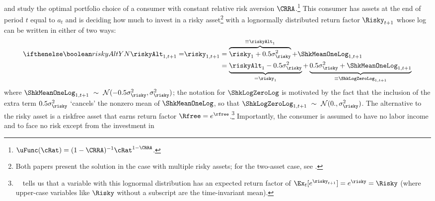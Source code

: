 
\newcommand{\scale}{x}

\cite{merton:restat} and \cite{samuelson:portfolio} study the optimal portfolio choice of a consumer with constant relative risk aversion $\CRRA$.\footnote{$\uFunc(\cRat) = (1-\CRRA)^{-1}\cRat^{1-\CRRA}$.}  This consumer has assets at the end of period $t$ equal to $a_{t}$ and is deciding how much to invest in a risky asset\footnote{Both papers present the solution in the case with multiple risky assets; for the two-asset case, see .} with a lognormally distributed return factor $\Risky_{t+1}$ whose log can be written in either of two ways:
\begin{equation}\begin{gathered}\begin{aligned}
    \ifriskyAlt{\riskyAlt_{1,t+1} = }{}      \risky_{1,t+1}  & =  \overbrace{\risky_{1}+0.5\sigma^{2}_{\risky}}^{\equiv \riskyAlt_{1}}+\ShkMeanOneLog_{1,t+1}
\\   & =  \underbrace{\riskyAlt_{1}-0.5\sigma^{2}_{\risky}}_{=\risky_{1}}+\underbrace{0.5\sigma^{2}_{\risky}+\ShkMeanOneLog_{1,t+1}}_{\equiv \ShkLogZeroLog_{1,t+1}}
\end{aligned}\end{gathered}\end{equation}
where $\ShkMeanOneLog_{1,t+1}~\sim~\mathcal{N}(-0.5 \sigma^{2}_{\risky},\sigma^{2}_{\risky})$; the notation for $\ShkLogZeroLog$ is motivated by the fact that the inclusion of the extra term $0.5\sigma^{2}_{\risky}$ `cancels' the nonzero mean of $\ShkMeanOneLog$, so that $\ShkLogZeroLog_{1,t+1}~\sim~\mathcal{N}(0.,\sigma^{2}_{\risky})$.
The alternative to the risky asset is a riskfree asset that earns return factor
  $\Rfree=e^{\rfree}$.\footnote{\MathFactsList~\ELogNorm~tells us that a variable with this lognormal distribution has an
    expected return factor of
    $\Ex_{t}[e^{\risky_{t+1}}]=e^{\risky}=\Risky$ (where upper-case variables
    like $\Risky$ without a subscript are the time-invariant mean).}  Importantly, the consumer is assumed to have
  no labor income and to face no risk except from the investment in
